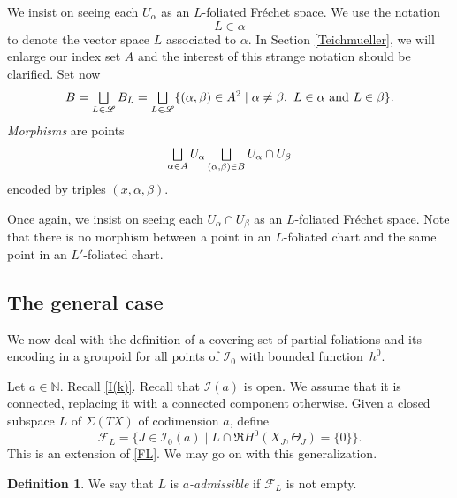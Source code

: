 \documentclass[10pt]{amsart}
\let\mathcal\mathscr
\let\oldbigsqcup\bigsqcup
\renewcommand{\bigsqcup}{\mathop{\textstyle\oldbigsqcup}\displaylimits}
\theoremstyle{plain}
\theoremstyle{definition}
\newtheorem{definition}[theorem]{Definition}
\theoremstyle{remark}
\numberwithin{equation}{section}
\newcommand{\cI}{\mathcal{I}}
\let\uniondisjointe\bigsqcup
\begin{document}
We insist on seeing each $U_{\alpha}$ as an $L$-foliated Fréchet space. We use the notation
\begin{equation}
\label{Lalpha}
L\in\alpha
\end{equation}
to denote the vector space $L$ associated to $\alpha$. In Section \ref{Teichmueller}, we will enlarge our index set $A$ and the interest of this strange notation should be clarified. Set now
\begin{equation}
\label{B}
B=\uniondisjointe_{L\in\mathcal L} B_L=\uniondisjointe_{L\in\mathcal L}\{(\alpha,\beta)\in A^2\mid \alpha\not = \beta,\ L\in\alpha\text{ and }L\in\beta\}.
\end{equation}
\emph{Morphisms} are
points
\begin{equation}
\label{morphisms}
\uniondisjointe_{\alpha\in A}U_\alpha\uniondisjointe _{(\alpha,\beta)\in B} U_{\alpha}\cap U_{\beta}
\end{equation}
encoded by triples $(x,\alpha,\beta)$.

Once again, we insist on seeing each $U_{\alpha}\cap U_{\beta}$ as an $L$-foliated Fréchet space. Note that there is no morphism between a point in an $L$-foliated chart and the same point in an $L'$-foliated chart.

\subsection{The general case}
\label{multifoliategeneral}
We now deal with the definition of a covering set of partial foliations and its encoding in a groupoid for all points of $\cI_0$ with bounded function~$h^0$.

Let $a\in\mathbb N$. Recall \eqref{I(k)}. Recall that $\cI(a)$ is open. We assume that it is connected, replacing it with a connected component otherwise. Given a closed subspace $L$ of $\Sigma(TX)$ of codimension $a$, define
\begin{equation}
\label{FLbis}
\mathcal F_L=\{J\in\cI_0(a)\mid L\cap\Re H^0(X_J,\Theta_J)=\{0\}\}.
\end{equation}
This is an extension of \eqref{FL}. We may go on with this generalization.

\begin{definition}
We say that $L$ is \emph{$a$-admissible} if $\mathcal F_L$ is not empty.
\end{definition}
\end{document}

